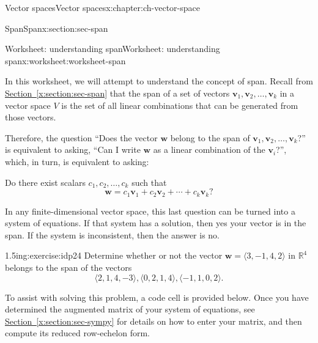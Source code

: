 \documentclass[oneside,10pt,]{book}
\newcommand{\xreffont}{\relax}
\numberwithin{equation}{section}
\newcommand{\R}{\mathbb{R}}
\newcommand{\vv}{\mathbf{v}}
\newcommand{\ww}{\mathbf{w}}
\begin{document}
\begin{chapterptx}{Vector spaces}{}{Vector spaces}{}{}{x:chapter:ch-vector-space}
\begin{sectionptx}{Span}{}{Span}{}{}{x:section:sec-span}
\end{sectionptx}
%
%
\typeout{************************************************}
\typeout{************************************************}
%
\begin{worksheet-section}{Worksheet: understanding span}{}{Worksheet: understanding span}{}{}{x:worksheet:worksheet-span}
\begin{introduction}{}%
In this worksheet, we will attempt to understand the concept of span. Recall from \hyperref[x:section:sec-span]{Section~{\xreffont\ref{x:section:sec-span}}} that the span of a set of vectors \(\vv_1, \vv_2,\ldots, \vv_k\) in a vector space \(V\) is the set of all linear combinations that can be generated from those vectors.%
\par
Therefore, the question ``Does the vector \(\ww\) belong to the span of \(\vv_1, \vv_2,\ldots, \vv_k\)?'' is equivalent to asking, ``Can I write \(\ww\) as a linear combination of the \(\vv_i\)?'', which, in turn, is equivalent to asking:%
\par
Do there exist scalars \(c_1,c_2,\ldots, c_k\) such that%
\begin{equation*}
\ww=c_1\vv_1+c_2\vv_2+\cdots +c_k\vv_k\text{?}
\end{equation*}
%
\par
In any finite-dimensional vector space, this last question can be turned into a system of equations. If that system has a solution, then yes \textemdash{} your vector is in the span. If the system is inconsistent, then the answer is no.%
\end{introduction}%
\begin{divisionexercise}{1}{}{1.5in}{g:exercise:idp24}%
Determine whether or not the vector \(\ww=\langle 3,-1, 4, 2\rangle\) in \(\R^4\) belongs to the span of the vectors%
\begin{equation*}
\langle 2, 1, 4, -3\rangle, \langle 0, 2, 1, 4\rangle, \langle -1, 1, 0, 2\rangle\text{.}
\end{equation*}
%
\end{divisionexercise}%
To assist with solving this problem, a code cell is provided below. Once you have determined the augmented matrix of your system of equations, see \hyperref[x:section:sec-sympy]{Section~{\xreffont\ref{x:section:sec-sympy}}} for details on how to enter your matrix, and then compute its reduced row-echelon form.%
\begin{sageinput}

\end{sageinput}
\end{worksheet-section}
\end{chapterptx}
\end{document}
